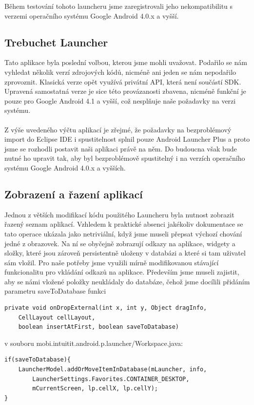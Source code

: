 \documentclass[thesis=M,czech]{FITthesis}[2012/06/26]
\begin{document}
Během testování tohoto launcheru jsme zaregistrovali jeho nekompatibilitu s verzemi operačního systému Google Android 4.0.x a vyšší.

\subsection{Trebuchet Launcher}
Tato aplikace byla poslední volbou, kterou jsme mohli uvažovat. Podařilo se nám vyhledat několik verzí zdrojových kódů, nicméně ani jeden se nám nepodařilo zprovoznit. Klasická verze opět využívá privátní API, která není součástí SDK. Upravená samostatná verze je sice této provázanosti zbavena, nicméně funkční je pouze pro Google Android 4.1 a vyšší, což nesplňuje naše požadavky na verzi systému.
\\\\
Z výše uvedeného výčtu aplikací je zřejmé, že požadavky na bezproblémový import do Eclipse IDE i spustitelnost splnil pouze Android Launcher Plus a proto jsme se rozhodli postavit naši aplikaci právě na něm. Do budoucna však bude nutné ho upravit tak, aby byl bezproblémově spustitelný i na verzích operačního systému Google Android 4.0.x a vyšších.

\subsection{Zobrazení a řazení aplikací}
Jednou z větších modifikací kódu použitého Launcheru byla nutnost zobrazit řazený seznam aplikací. Vzhledem k praktické absenci jakékoliv dokumentace se tato operace ukázala jako netriviální, když jsme museli přepsat výchozí chování jedné z obrazovek. Na ní se obyčejně zobrazují odkazy na aplikace, widgety a složky, které jsou zároveň persistentně uloženy v databázi a které si tam uživatel sám vložil. Pro naše potřeby jsme využili mírně modifikovanou stávající funkcionalitu pro vkládání odkazů na aplikace. Především jsme museli zajistit, aby se námi vložené položky neukládaly do databáze, čehož jsme docílili přidáním parametru saveToDatabase funkci

\begin{verbatim}
private void onDropExternal(int x, int y, Object dragInfo, 
    CellLayout cellLayout,
    boolean insertAtFirst, boolean saveToDatabase)
\end{verbatim}
v souboru mobi.intuitit.android.p.launcher/Workspace.java:

\begin{verbatim}
if(saveToDatabase){
    LauncherModel.addOrMoveItemInDatabase(mLauncher, info,
        LauncherSettings.Favorites.CONTAINER_DESKTOP, 
        mCurrentScreen, lp.cellX, lp.cellY);
}
\end{verbatim}
\end{document}
